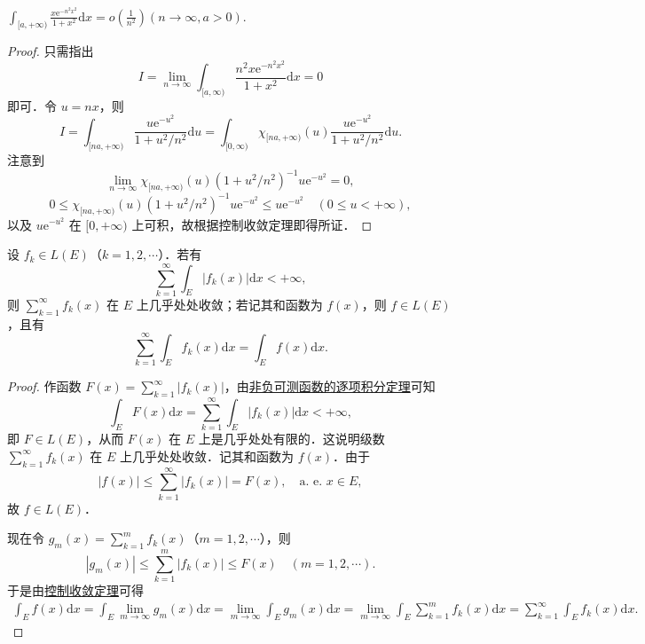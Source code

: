 \documentclass[../../main.tex]{subfiles}%
\begin{document}
\begin{example}
$\int_{[a, +\infty)} \frac{x\text{e}^{-n^2 x^2}}{1 + x^2} \mathrm{d}x = o\left( \frac{1}{n^2} \right) (n \to \infty, a > 0).$
\end{example}
\begin{proof}

只需指出
\[
I = \lim_{n \to \infty} \int_{[a, \infty)} \frac{n^2 x\text{e}^{-n^2 x^2}}{1 + x^2} \mathrm{d}x = 0
\]
即可．令 \(u = nx\)，则
\[
I = \int_{[na, +\infty)} \frac{u\text{e}^{-u^2}}{1 + u^2 / n^2} \mathrm{d}u = \int_{[0, \infty)} \chi_{[na, +\infty)}(u) \frac{u\text{e}^{-u^2}}{1 + u^2 / n^2} \mathrm{d}u.
\]
注意到
\[
\lim_{n \to \infty} \chi_{[na, +\infty)}(u) (1 + u^2 / n^2)^{-1} u\text{e}^{-u^2} = 0,
\]
\[
0 \leqslant \chi_{[na, +\infty)}(u) (1 + u^2 / n^2)^{-1} u\text{e}^{-u^2} \leqslant u\text{e}^{-u^2} \quad (0 \leqslant u < +\infty),
\]
以及 \(u\text{e}^{-u^2}\) 在 \([0, +\infty)\) 上可积，故根据控制收敛定理即得所证．

\end{proof}

\begin{corollary}[逐项积分定理]\label{corollary:逐项积分定理}
设 \( f_k \in L(E) \)（\( k = 1,2,\cdots \)）．若有
\[
\sum_{k=1}^{\infty} \int_E |f_k(x)| \mathrm{d}x < +\infty,
\]
则 \( \sum_{k=1}^{\infty} f_k(x) \) 在 \( E \) 上几乎处处收敛；若记其和函数为 \( f(x) \)，则 \( f \in L(E) \)，且有
\[
\sum_{k=1}^{\infty} \int_E f_k(x) \mathrm{d}x = \int_E f(x) \mathrm{d}x. 
\]
\end{corollary}
\begin{proof}

作函数 \( F(x) = \sum_{k=1}^{\infty} |f_k(x)| \)，由\hyperref[theorem:非负可测函数的逐项积分定理]{非负可测函数的逐项积分定理}可知
\[
\int_E F(x) \mathrm{d}x = \sum_{k=1}^{\infty} \int_E |f_k(x)| \mathrm{d}x < +\infty,
\]
即 \( F \in L(E) \)，从而 \( F(x) \) 在 \( E \) 上是几乎处处有限的．这说明级数 \( \sum_{k=1}^{\infty} f_k(x) \) 在 \( E \) 上几乎处处收敛．记其和函数为 \( f(x) \)．由于
\[
|f(x)| \leqslant \sum_{k=1}^{\infty} |f_k(x)| = F(x), \quad \text{a. e. } x \in E,
\]
故 \( f \in L(E) \)．

现在令 \( g_m(x) = \sum_{k=1}^{m} f_k(x) \)（\( m = 1,2,\cdots \)），则
\[
|g_m(x)| \leqslant \sum_{k=1}^{m} |f_k(x)| \leqslant F(x) \quad (m = 1,2,\cdots).
\]
于是由\hyperref[theorem:控制收敛定理]{控制收敛定理}可得
\begin{align*}
\int_E{f(x)\mathrm{d}x}=\int_E{\lim_{m\rightarrow \infty} g_m(x)\mathrm{d}x}=\lim_{m\rightarrow \infty} \int_E{g_m(x)\mathrm{d}x}=\underset{m\rightarrow \infty}{\lim}\int_E{\sum_{k=1}^m{f_k\left( x \right)}\mathrm{d}x}=\sum_{k=1}^{\infty}{\int_E{f_k(x)\mathrm{d}x}}.
\end{align*}

\end{proof}
\end{document}
